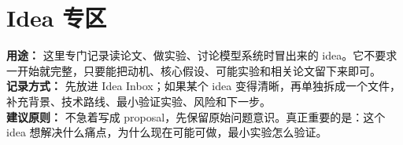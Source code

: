 
\section*{Idea 专区}
{}

\begin{conceptbox}
\textbf{用途：} 这里专门记录读论文、做实验、讨论模型系统时冒出来的 idea。它不要求一开始就完整，只要能把动机、核心假设、可能实验和相关论文留下来即可。\\
\textbf{记录方式：} 先放进 Idea Inbox；如果某个 idea 变得清晰，再单独拆成一个文件，补充背景、技术路线、最小验证实验、风险和下一步。\\
\textbf{建议原则：} 不急着写成 proposal，先保留原始问题意识。真正重要的是：这个 idea 想解决什么痛点，为什么现在可能可做，最小实验怎么验证。
\end{conceptbox}

% 
% 
% 
% 
% 


% 
